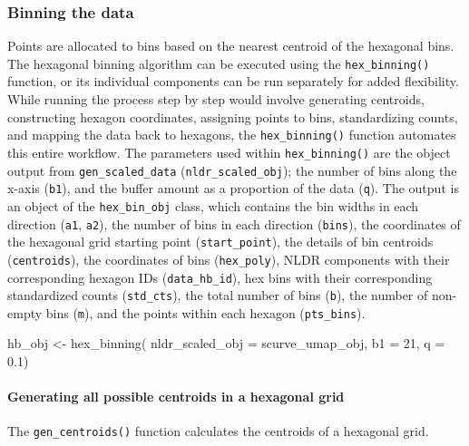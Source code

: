 \documentclass[
  11pt,
  a4paper,
]{report}
\newenvironment{Shaded}{\begin{snugshade}}{\end{snugshade}}
\newcommand{\AttributeTok}[1]{\textcolor[rgb]{0.40,0.45,0.13}{#1}}
\newcommand{\DecValTok}[1]{\textcolor[rgb]{0.68,0.00,0.00}{#1}}
\newcommand{\FloatTok}[1]{\textcolor[rgb]{0.68,0.00,0.00}{#1}}
\newcommand{\FunctionTok}[1]{\textcolor[rgb]{0.28,0.35,0.67}{#1}}
\newcommand{\NormalTok}[1]{\textcolor[rgb]{0.00,0.23,0.31}{#1}}
\newcommand{\OtherTok}[1]{\textcolor[rgb]{0.00,0.23,0.31}{#1}}
\begin{document}
\subsubsection{Binning the data}\label{binning-the-data-1}

Points are allocated to bins based on the nearest centroid of the
hexagonal bins. The hexagonal binning algorithm can be executed using
the \texttt{hex\_binning()} function, or its individual components can
be run separately for added flexibility. While running the process step
by step would involve generating centroids, constructing hexagon
coordinates, assigning points to bins, standardizing counts, and mapping
the data back to hexagons, the \texttt{hex\_binning()} function
automates this entire workflow. The parameters used within
\texttt{hex\_binning()} are the object output from
\texttt{gen\_scaled\_data} (\texttt{nldr\_scaled\_obj}); the number of
bins along the x-axis (\texttt{b1}), and the buffer amount as a
proportion of the data (\texttt{q}). The output is an object of the
\texttt{hex\_bin\_obj} class, which contains the bin widths in each
direction (\texttt{a1}, \texttt{a2}), the number of bins in each
direction (\texttt{bins}), the coordinates of the hexagonal grid
starting point (\texttt{start\_point}), the details of bin centroids
(\texttt{centroids}), the coordinates of bins (\texttt{hex\_poly}), NLDR
components with their corresponding hexagon IDs (\texttt{data\_hb\_id}),
hex bins with their corresponding standardized counts
(\texttt{std\_cts}), the total number of bins (\texttt{b}), the number
of non-empty bins (\texttt{m}), and the points within each hexagon
(\texttt{pts\_bins}).

\begin{Shaded}
\begin{Highlighting}[]
\NormalTok{hb\_obj }\OtherTok{\textless{}{-}} \FunctionTok{hex\_binning}\NormalTok{(}
  \AttributeTok{nldr\_scaled\_obj =}\NormalTok{ scurve\_umap\_obj, }
  \AttributeTok{b1 =} \DecValTok{21}\NormalTok{, }
  \AttributeTok{q =} \FloatTok{0.1}\NormalTok{)}
\end{Highlighting}
\end{Shaded}

\paragraph{Generating all possible centroids in a hexagonal
grid}\label{generating-all-possible-centroids-in-a-hexagonal-grid}

The \texttt{gen\_centroids()} function calculates the centroids of a
hexagonal grid.
\end{document}

